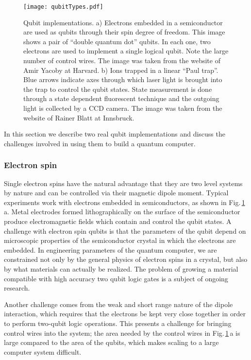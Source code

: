 \begin{figure}
\begin{centering}
\texttt{[image: qubitTypes.pdf]}
\par\end{centering}
\caption{Qubit implementations. a) Electrons embedded in a semiconductor are used as qubits through their spin degree of freedom. This image shows a pair of ``double quantum dot'' qubits. In each one, two electrons are used to implement a single logical qubit. Note the large number of control wires. The image was taken from the website of Amir Yacoby at Harvard. b) Ions trapped in a linear ``Paul trap''. Blue arrows indicate axes through which laser light is brought into the trap to control the qubit states. State measurement is done through a state dependent fluorescent technique and the outgoing light is collected by a CCD camera. The image was taken from the website of Rainer Blatt at Innsbruck.}
\label{Fig:qubitTypes}
\end{figure}

In this section we describe two real qubit implementations and discuss the challenges involved in using them to build a quantum computer.

\subsubsection{Electron spin}
Single electron spins have the natural advantage that they are two level systems by nature and can be controlled via their magnetic dipole moment.
Typical experiments work with electrons embedded in semiconductors, as shown in Fig.\,\ref{Fig:qubitTypes}\,a.
Metal electrodes formed lithographically on the surface of the semiconductor produce electromagnetic fields which contain and control the qubit states.
A challenge with electron spin qubits is that the parameters of the qubit depend on microscopic properties of the semiconductor crystal in which the electrons are embedded.
In engineering parameters of the quantum computer, we are constrained not only by the general physics of electron spins in a crystal, but also by what materials can actually be realized.
The problem of growing a material compatible with high accuracy two qubit logic gates is a subject of ongoing research.

Another challenge comes from the weak and short range nature of the dipole interaction, which requires that the electrons be kept very close together in order to perform two-qubit logic operations.
This presents a challenge for bringing control wires into the system; the area needed by the control wires in Fig.\,\ref{Fig:qubitTypes}\,a is large compared to the area of the qubits, which makes scaling to a large computer system difficult.

